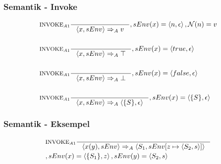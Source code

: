 \begin{frame}
	\frametitle{Semantik - Invoke}
	\begin{align*}
	&\inference[$\text{INVOKE}_{A1}$]{}
                  {\Braket{x,sEnv} \Rightarrow_A v}
                  {,sEnv(x) = \Braket{n,\epsilon}, \mathcal{N}(n) = v}
	\\\\
	&\inference[$\text{INVOKE}_{A1}$]{}
                  {\Braket{x,sEnv} \Rightarrow_A \top}
                  {,sEnv(x) = \Braket{true,\epsilon}}
	\\\\
	&\inference[$\text{INVOKE}_{A1}$]{}
                  {\Braket{x,sEnv} \Rightarrow_A \bot}
                  {,sEnv(x) = \Braket{false,\epsilon}}
  \\\\
	&\inference[$\text{INVOKE}_{A1}$]{}
                  {\Braket{x,sEnv} \Rightarrow_A \Braket{\{S\},\epsilon}}
                  {,sEnv(x) = \Braket{\{S\},\epsilon}}
	\end{align*}
\end{frame}

\begin{frame}
	\frametitle{Semantik - Eksempel}
	\begin{align*}
	&\inference[$\text{INVOKE}_{A1}$]{}
                  {\Braket{x(y),sEnv} \Rightarrow_A \Braket{S_1,sEnv[z \mapsto \Braket{S_2,s}]}}
                  \\
					        &{,sEnv(x) = \Braket{\{S_1\},z},sEnv(y) = \Braket{S_2,s}}
	\end{align*}
\end{frame}